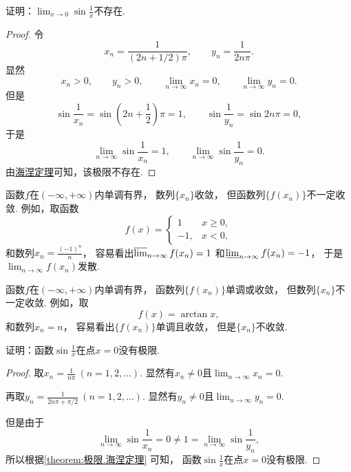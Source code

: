 \begin{example}
证明：\(\lim_{x\to0} \sin\frac1x\)不存在.
\begin{proof}
令\[
	x_n = \frac1{(2n+1/2)\pi},
	\qquad
	y_n = \frac1{2n\pi}.
\]
显然\[
	x_n>0,
	\qquad
	y_n>0,
	\qquad
	\lim_{n\to\infty} x_n = 0,
	\qquad
	\lim_{n\to\infty} y_n = 0.
\]
但是\[
	\sin\frac1{x_n}
	= \sin\left(2n+\frac12\right)\pi
	= 1,
	\qquad
	\sin\frac1{y_n}
	= \sin 2n\pi
	= 0,
\]
于是\[
	\lim_{n\to\infty} \sin\frac1{x_n} = 1,
	\qquad
	\lim_{n\to\infty} \sin\frac1{y_n} = 0.
\]
由\hyperref[theorem:极限.海涅定理]{海涅定理}可知，该极限不存在.
\end{proof}
\end{example}

\begin{example}
函数\(f\)在\((-\infty,+\infty)\)内单调有界，
数列\(\{x_n\}\)收敛，
但函数列\(\{f(x_n)\}\)不一定收敛.
例如，取函数\[
	f(x) = \left\{ \begin{array}{rl}
		1 & x\geq0, \\
		-1, & x<0,
	\end{array} \right.
\]
和数列\(x_n = \frac{(-1)^n}{n}\)，
容易看出\(\varlimsup_{n\to\infty} f(x_n) = 1\)
和\(\varliminf_{n\to\infty} f(x_n) = -1\)，
于是\(\lim_{n\to\infty} f(x_n)\)发散.
\end{example}

\begin{example}
函数\(f\)在\((-\infty,+\infty)\)内单调有界，
函数列\(\{f(x_n)\}\)单调或收敛，
但数列\(\{x_n\}\)不一定收敛.
例如，取\[
	f(x) = \arctan x,
\]
和数列\(x_n = n\)，
容易看出\(\{f(x_n)\}\)单调且收敛，
但是\(\{x_n\}\)不收敛.
\end{example}

\begin{example}
证明：函数\(\sin\frac1x\)在点\(x=0\)没有极限.
\begin{proof}
取\(x_n = \frac1{n\pi}\ (n=1,2,\dotsc)\).
显然有\(x_n\neq0\)且\(\lim_{n\to\infty} x_n = 0\).

再取\(y_n = \frac1{2n\pi+\pi/2}\ (n=1,2,\dotsc)\).
显然有\(y_n\neq0\)且\(\lim_{n\to\infty} y_n = 0\).

但是由于\[
	\lim_{n\to\infty} \sin\frac1{x_n} = 0
	\neq 1 = \lim_{n\to\infty} \sin\frac1{y_n},
\]
所以根据\cref{theorem:极限.海涅定理} 可知，
函数\(\sin\frac1x\)在点\(x=0\)没有极限.
\end{proof}
\end{example}


